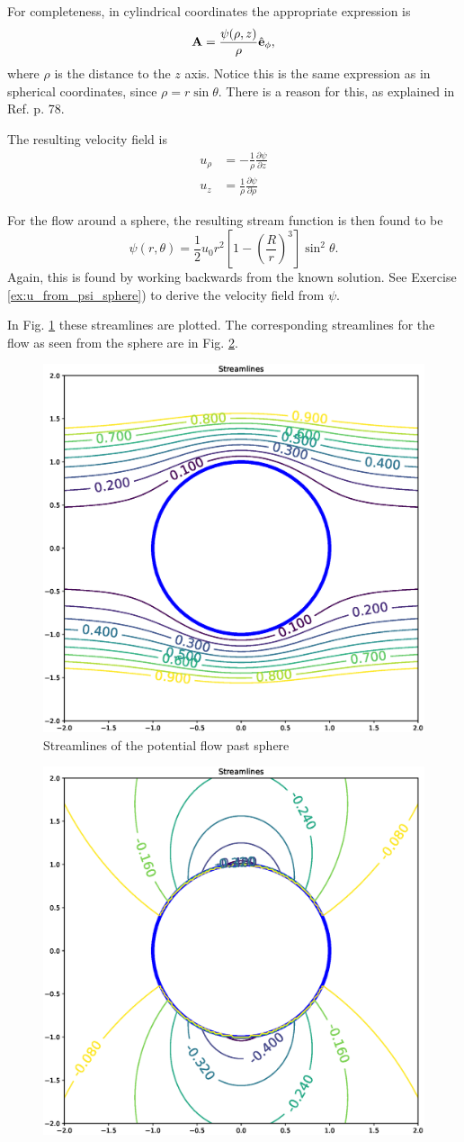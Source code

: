 For completeness, in cylindrical coordinates the appropriate
expression is
\[
  \mathbf{A} = \frac{\psi(\rho, z)}{ \rho } \hat{\mathbf{e}}_\phi ,
\]
where $\rho$ is the distance to the $z$ axis. Notice this is the same
expression as in spherical coordinates, since
$\rho=r\sin\theta$. There is a reason for this, as explained in
Ref. \cite{batchelor} p. 78.


The resulting velocity field is
\begin{equation*}
  \begin{split}
    u_\rho   &= - \frac1{\rho} \frac{\partial \psi}{\partial z} \\
    u_z     &=   \frac1{\rho} \frac{\partial \psi}{\partial \rho}
  \end{split}
\end{equation*}


For the flow around a sphere, the resulting stream function is then
found to be
\begin{equation}
  \label{eq:potential_sphere_stream}
  \psi(r,\theta) = \frac12 u_0 r^2
  \left[
    1 -
    \left(\frac{R}{r}\right)^3
  \right] \sin^2\theta .
\end{equation}
Again, this is found by working backwards from the known solution.
See Exercise \ref{ex:u_from_psi_sphere}) to derive the velocity field
from $\psi$.

In Fig. \ref{fig:potential_streamlines_sphere} these streamlines are
plotted. The corresponding streamlines for the flow as seen from the
sphere are in Fig. \ref{fig:potential_streamlines_moving_sphere}.

\begin{figure}
  \centering
  \includegraphics[width=0.4\linewidth]{figures/potential_flow_past_sphere}
  \caption{\label{fig:potential_streamlines_sphere} Streamlines of
    the potential flow past sphere}
\end{figure}



\begin{figure}
  \centering
  \includegraphics[width=0.4\linewidth]{figures/potential_flow_past_sphere_moving}
  \caption{\label{fig:potential_streamlines_moving_sphere}}
\end{figure}


